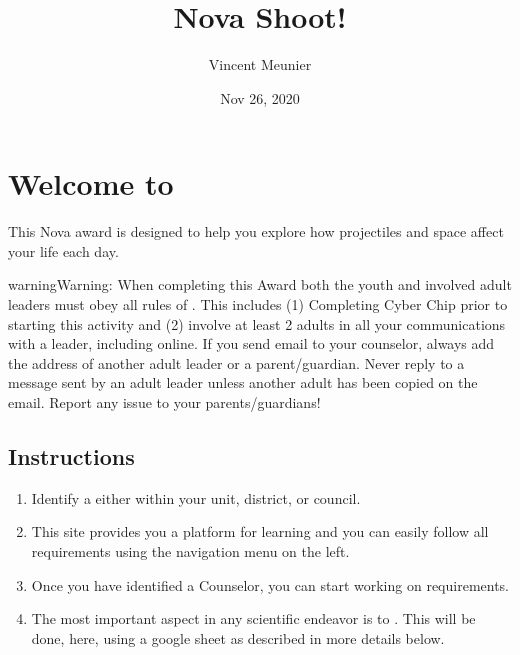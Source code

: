 \documentclass[letterpaper,10pt,english,openany,oneside]{sphinxmanual}
\title{Nova \sphinxhyphen{} Shoot!}
\date{Nov 26, 2020}
\author{Vincent Meunier}
\begin{document}
\pagestyle{empty}
\sphinxmaketitle
\pagestyle{plain}
\sphinxtableofcontents
\pagestyle{normal}
\label{\detokenize{index::doc}}



\chapter{Welcome to }
\label{\detokenize{introduction:welcome-to-shoot}}\label{\detokenize{introduction:introduction}}\label{\detokenize{introduction::doc}}
This Nova award is designed to help you explore how projectiles and space affect your life each day.

\begin{sphinxadmonition}{warning}{Warning:}
When completing this Award both the youth and involved adult leaders must obey all rules of . This includes (1) Completing Cyber Chip prior to starting this activity and (2)  involve at least 2 adults in all your communications with a leader, including online. If you send email to your counselor, always add the address of another adult leader or a parent/guardian. Never reply to a message sent by an adult leader unless another adult has been copied on the email. Report any issue to your parents/guardians!
\end{sphinxadmonition}


\section{Instructions}
\label{\detokenize{introduction:instructions}}\begin{enumerate}
%
\item {} 
Identify a  either within your unit, district, or council.

\item {} 
This site provides you a platform for learning and you can easily follow all requirements using the navigation menu on the left.

\item {} 
Once you have identified a Counselor, you can start working on requirements.

\item {} 
The most important aspect in any scientific endeavor is to . This will be done, here, using a google sheet as described in more details below.

\end{enumerate}
\end{document}
